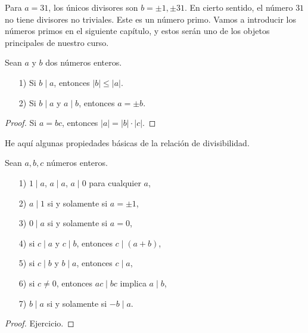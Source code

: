 \begin{ejemplo}
  Para $a = 31$, los únicos divisores son $b = \pm 1, \pm 31$. En cierto
  sentido, el número $31$ no tiene divisores no triviales. Este es un número
  primo. Vamos a introducir los números primos en el siguiente capítulo, y estos
  serán uno de los objetos principales de nuestro curso.
\end{ejemplo}

\begin{proposicion}
  Sean $a$ y $b$ dos números enteros.

  \begin{enumerate}
  \item[1)] Si $b \mid a$, entonces $|b| \le |a|$.

  \item[2)] Si $b \mid a$ y $a \mid b$, entonces $a = \pm b$.
  \end{enumerate}

  \begin{proof}
    Si $a = bc$, entonces $|a| = |b| \cdot |c|$.
  \end{proof}
\end{proposicion}

He aquí algunas propiedades básicas de la relación de divisibilidad.

\begin{proposicion}
  Sean $a,b,c$ números enteros.

  \begin{enumerate}
  \item[1)] $1\mid a$, $a \mid a$, $a \mid 0$ para cualquier $a$,

  \item[2)] $a\mid 1$ si y solamente si $a = \pm 1$,

  \item[3)] $0\mid a$ si y solamente si $a = 0$,

  \item[4)] si $c \mid a$ y $c \mid b$, entonces $c \mid (a + b)$,

  \item[5)] si $c \mid b$ y $b \mid a$, entonces $c \mid a$,

  \item[6)] si $c \ne 0$, entonces $ac \mid bc$ implica $a\mid b$,

  \item[7)] $b \mid a$ si y solamente si $-b \mid a$.
  \end{enumerate}

  \begin{proof}
    Ejercicio.
  \end{proof}
\end{proposicion}

